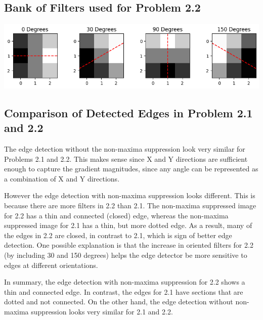 \documentclass[12pt]{article}
\begin{document}
\subsection{Bank of Filters used for Problem 2.2}
\includegraphics[width=\textwidth]{images/FiltersBank.png}


\subsection{Comparison of Detected Edges in Problem 2.1 and 2.2}
The edge detection without the non-maxima suppression look very similar for Problems 2.1 and 2.2. This makes sense since X and Y directions are sufficient enough to capture the gradient magnitudes, since any angle can be represented as a combination of X and Y directions. 

However the edge detection with non-maxima suppression looks different. This is because there are more filters in 2.2 than 2.1. The non-maxima suppressed image for 2.2 has a thin and connected (closed) edge, whereas the non-maxima suppressed image for 2.1 has a thin, but more dotted edge. As a result, many of the edges in 2.2 are closed, in contrast to 2.1, which is sign of better edge detection. One possible explanation is that the increase in oriented filters for 2.2 (by including 30 and 150 degrees) helps the edge detector be more sensitive to edges at different orientations.

In summary, the edge detection with non-maxima suppression for 2.2 shows a thin and connected edge. In contrast, the edges for 2.1 have sections that are dotted and not connected. On the other hand, the edge detection without non-maxima suppression looks very similar for 2.1 and 2.2.
\end{document}
